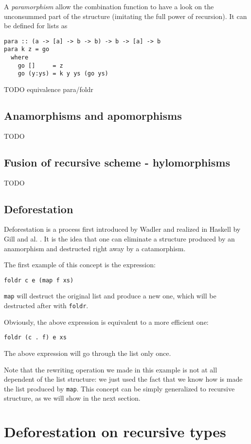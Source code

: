 \documentclass[format=sigplan]{acmart}
\newcommand{\minline}[1]{\texttt{#1}}
\begin{document}
A \emph{paramorphism} allow the combination function to have a look on the unconsummed part of the structure (imitating the full power of recursion). It can be defined for lists as

\begin{verbatim}
para :: (a -> [a] -> b -> b) -> b -> [a] -> b
para k z = go
  where
    go []     = z
    go (y:ys) = k y ys (go ys)
\end{verbatim}

TODO equivalence para/foldr

\subsection{Anamorphisms and apomorphisms}
TODO

\subsection{Fusion of recursive scheme - hylomorphisms}
TODO

\subsection{Deforestation}
Deforestation is a process first introduced by Wadler \cite{WADLER1990231} and realized in Haskell by Gill and al. \cite{Gill:1993:SCD:165180.165214}. It is the idea that one can eliminate a structure produced by an anamorphism and destructed right away by a catamorphism.

The first example of this concept is the expression:
\begin{verbatim}
foldr c e (map f xs)
\end{verbatim}
\minline{map} will destruct the original list and produce a new one, which will be destructed after with \minline{foldr}.

Obviously, the above expression is equivalent to a more efficient one:
\begin{verbatim}
foldr (c . f) e xs
\end{verbatim}
The above expression will go through the list only once.

Note that the rewriting operation we made in this example is not at all dependent of the list structure: we just used the fact that we know how is made the list produced by \minline{map}. This concept can be simply generalized to recursive structure, as we will show in the next section.

\section{Deforestation on recursive types}
\end{document}

